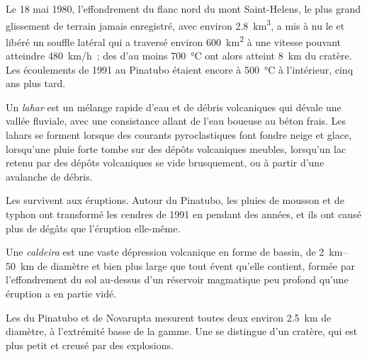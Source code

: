 Le 18 mai 1980, l'effondrement du flanc nord du mont Saint-Helens, le plus grand glissement de terrain
jamais enregistré, avec environ \qty{2.8}{km^3}, a mis à nu le  et libéré un souffle latéral qui a
traversé environ \qty{600}{km^2} à une vitesse pouvant atteindre
\qty{480}{km/h}~; des  d'au moins \qty{700}{\celsius} ont alors atteint
\qty{8}{km} du cratère. Les écoulements de 1991 au Pinatubo étaient encore à \qty{500}{\celsius}
à l'intérieur, cinq ans plus tard.

\begin{definition}[Lahar]\label{def:b2:eruptive-styles:lahar}
Un \emph{lahar} est un mélange rapide d'eau et de débris volcaniques qui dévale une vallée fluviale,
avec une consistance allant de l'eau boueuse au béton frais. Les lahars se forment lorsque des courants pyroclastiques
font fondre neige et glace, lorsqu'une pluie forte tombe sur des dépôts volcaniques meubles,
lorsqu'un lac retenu par des dépôts volcaniques se vide brusquement,
ou à partir d'une avalanche de débris.
\end{definition}

Les  survivent aux éruptions. Autour du Pinatubo, les pluies de mousson et de typhon ont transformé les
cendres de 1991 en  pendant des années, et ils ont causé plus de dégâts que l'éruption
elle-même.

\begin{definition}[Caldeira]\label{def:b2:eruptive-styles:caldera}
Une \emph{caldeira} est une vaste dépression volcanique en forme de bassin,
de \qtyrange{2}{50}{km} de diamètre et bien plus large que tout évent qu'elle contient, formée par
l'effondrement du sol au-dessus d'un réservoir magmatique peu profond qu'une éruption a
en partie vidé.
\end{definition}

Les  du Pinatubo et de Novarupta mesurent toutes deux environ \qty{2.5}{km} de diamètre, à
l'extrémité basse de la gamme. Une  se distingue d'un cratère, qui est plus petit et creusé par des explosions.

